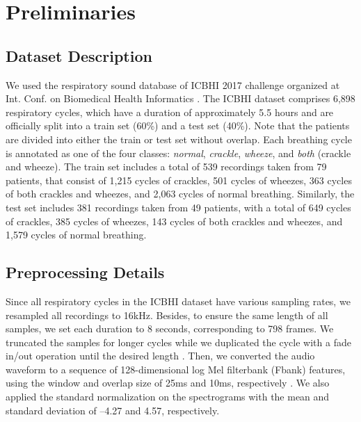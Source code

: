 \documentclass{INTERSPEECH2023}
\begin{document}
\vspace{-5pt}
\section{Preliminaries} 

\subsection{Dataset Description}
\vspace{-2pt}

We used the respiratory sound database of ICBHI 2017 challenge organized at Int. Conf. on Biomedical Health Informatics \cite{rocha2018alpha}. The ICBHI dataset comprises 6,898 respiratory cycles, which have a duration of approximately 5.5 hours and are officially split into a train set (60\%) and a test set (40\%). Note that the patients are divided into either the train or test set without overlap. Each breathing cycle is annotated as one of the four classes: \textit{normal}, \textit{crackle}, \textit{wheeze}, and \textit{both} (crackle and wheeze).
The train set includes a total of 539 recordings taken from 79 patients, that consist of 1,215 cycles of crackles, 501 cycles of wheezes, 363 cycles of both crackles and wheezes, and 2,063 cycles of normal breathing.
Similarly, the test set includes 381 recordings taken from 49 patients, with a total of 649 cycles of crackles, 385 cycles of wheezes, 143 cycles of both crackles and wheezes, and 1,579 cycles of normal breathing. 
\vspace{-5pt}



\subsection{Preprocessing Details}
\vspace{-2pt}


Since all respiratory cycles in the ICBHI dataset have various sampling rates, we resampled all recordings to 16kHz.
Besides, to ensure the same length of all samples, we set each duration to 8 seconds, corresponding to 798 frames.
We truncated the samples for longer cycles while we duplicated the cycle with a fade in/out operation until the desired length \cite{moummad2022supervised}. 
Then, we converted the audio waveform to a sequence of 128-dimensional log Mel filterbank (Fbank) features, using the window and overlap size of 25ms and 10ms, respectively \cite{gong2021ast}.
We also applied the standard normalization on the spectrograms with the mean and standard deviation of --4.27 and 4.57, respectively.
\vspace{-5pt}
\end{document}
